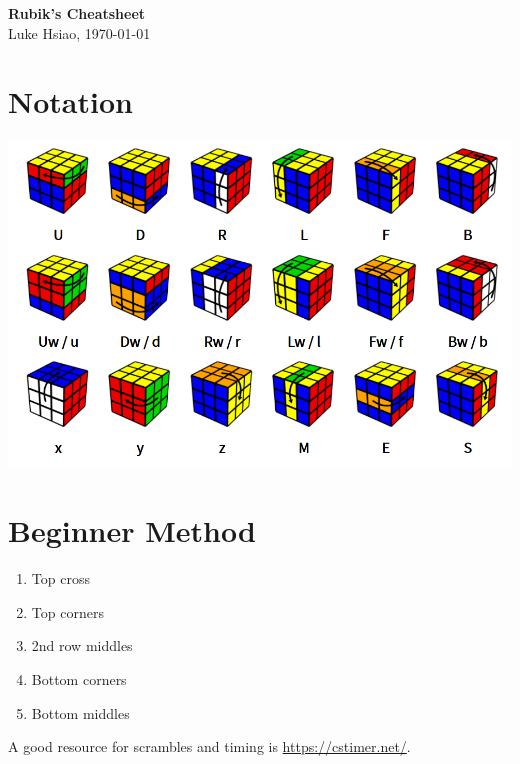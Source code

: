 \documentclass[10pt,landscape]{cheatsheet}
\begin{document}
\footnotesize
\begin{multicols}{3}

\begin{center}
     \Large{\textbf{Rubik's Cheatsheet}}\\
     \scriptsize{Luke Hsiao, \today}
\end{center}

\section{Notation}
\begin{Figure}
    \centering
    \includegraphics[width=\linewidth]{img/notation.png}
    \label{fig:notation}
\end{Figure}


\section{Beginner Method}

\begin{enumerate}
    \item Top cross
    \item Top corners
    \item 2nd row middles
    \item Bottom corners
    \item Bottom middles
\end{enumerate}

A good resource for scrambles and timing is \url{https://cstimer.net/}.


\end{multicols}
\end{document}
